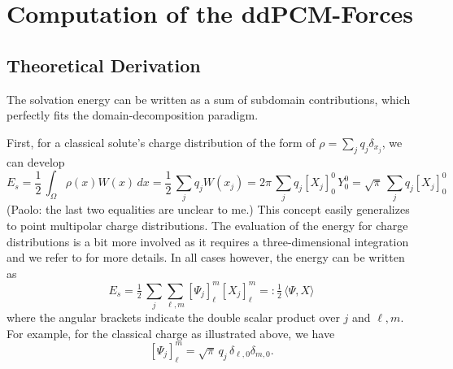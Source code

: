 \section{Computation of the ddPCM-Forces}\label{sec:forces}

\subsection{Theoretical Derivation}
The solvation energy can be written as a sum of subdomain contributions, which perfectly fits the domain-decomposition paradigm. 

First, for a classical solute's charge distribution of the form of $\rho=\sum_j q_j \delta_{x_j}$, we can develop
\[
	E_s 
	= \frac{1}{2} \,  \int_{\Omega} \rho(x) W(x) \, dx
	= \frac{1}{2} \, \sum_j q_j  W(x_j)
	= 2 \pi \, \sum_j q_j [X_j]_0^0    \, Y_0^0
	= {\sqrt{\pi}}\, \sum_j q_j [X_j]_0^0
\]
{\color{red} (Paolo: the last two equalities are unclear to me.)}
This concept easily generalizes to point multipolar charge distributions. 
The evaluation of the energy for charge distributions is a bit more involved as it requires a three-dimensional integration and we refer to \cite{Lipparini_JCP_ddCOSMO-QM} for more details. In all cases however, the energy can be written as
\[
E_s = \tfrac{1}{2}
 \, \sum_j \sum_{\ell,m} [\Psi_j]_\ell^m [X_j]_\ell^m
  =: \tfrac{1}{2} 
  \,\langle \Psi, X \rangle
\]
where the angular brackets indicate the double scalar product over $j$ and $\ell,m$.
For example, for the classical charge as illustrated above, we have 
\[
	[\Psi_j]_\ell^m = {\sqrt{\pi}}\, q_j \, \delta_{\ell,0} \delta_{m,0}.
\]


